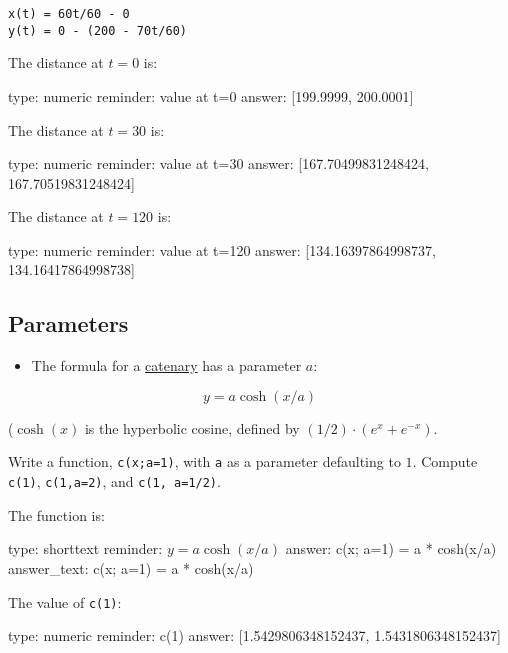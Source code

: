 \documentclass[12pt]{article}
\begin{document}
\begin{verbatim}
x(t) = 60t/60 - 0
y(t) = 0 - (200 - 70t/60)
\end{verbatim}
The distance at $t=0$ is:

\begin{answer}
    type: numeric
    reminder: value at t=0
    answer: [199.9999, 200.0001]

\end{answer}

The distance at $t=30$ is:

\begin{answer}
    type: numeric
    reminder: value at t=30
    answer: [167.70499831248424, 167.70519831248424]

\end{answer}

The distance at $t=120$ is:

\begin{answer}
    type: numeric
    reminder: value at t=120
    answer: [134.16397864998737, 134.16417864998738]

\end{answer}

\subsection{Parameters}

\begin{itemize}
\itemsep1pt\parskip0pt
\item
  The formula for a
  \href{http://en.wikipedia.org/wiki/Catenary}{catenary} has a parameter
  $a$:
\end{itemize}

\[
y = a \cosh(x/a)
\]

($\cosh(x)$ is the hyperbolic cosine, defined by
$(1/2) \cdot (e^x + e^{-x})$.

Write a function, \texttt{c(x;a=1)}, with \texttt{a} as a parameter
defaulting to $1$. Compute \texttt{c(1)}, \texttt{c(1,a=2)}, and
\texttt{c(1, a=1/2)}.

The function is:

\begin{answer}
type: shorttext
reminder: \( y = a \cosh(x/a) \)
answer: c(x; a=1) = a * cosh(x/a)
answer_text: c(x; a=1) = a * cosh(x/a) 
\end{answer}

The value of \texttt{c(1)}:

\begin{answer}
    type: numeric
    reminder: c(1)
    answer: [1.5429806348152437, 1.5431806348152437]

\end{answer}
\end{document}
